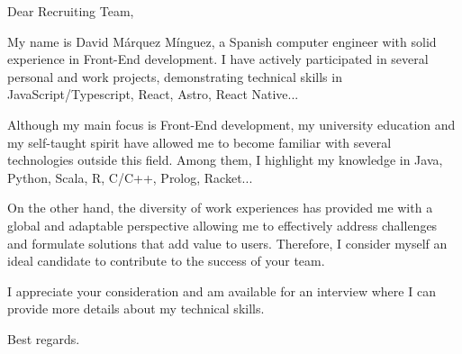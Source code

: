 \documentclass[letterpaper,11pt]{letter}
\begin{document}
\begin{letter}{}
\address{Madrid, Spain}

\opening{Dear Recruiting Team,}

My name is David Márquez Mínguez, a Spanish computer engineer with solid experience in Front-End development. I have actively participated in several personal and 
work projects, demonstrating technical skills in JavaScript/Typescript, React, Astro, React Native...

Although my main focus is Front-End development, my university education and my self-taught spirit have allowed me to become familiar with several technologies 
outside this field. Among them, I highlight my knowledge in Java, Python, Scala, R, C/C++, Prolog, Racket...

On the other hand, the diversity of work experiences has provided me with a global and adaptable perspective allowing me to effectively address challenges and
formulate solutions that add value to users. Therefore, I consider myself an ideal candidate to contribute to the success of your team.

I appreciate your consideration and am available for an interview where I can provide more details about my technical skills.

\signature{\vspace{-35pt}David Márquez Mínguez}
\closing{Best regards.}




\end{letter}
\end{document}
